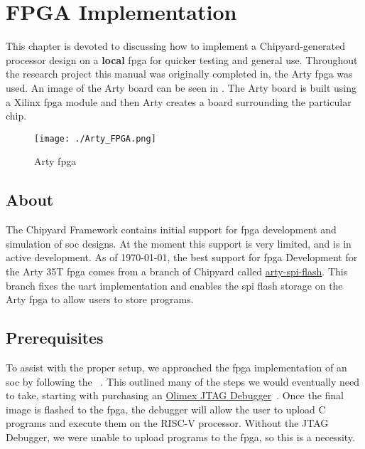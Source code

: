 \chapter{FPGA Implementation}\label{chap:FPGA_Implementation}
This chapter is devoted to discussing how to implement a Chipyard-generated processor design on a \textbf{local} \gls{fpga} for quicker testing and general use.
Throughout the research project this manual was originally completed in, the Arty \gls{fpga} was used.
An image of the Arty board can be seen in .
The Arty board is built using a Xilinx \gls{fpga} module and then Arty creates a board surrounding the particular chip.

\begin{figure}[h!tbp]
  \centering
  \texttt{[image: ./Arty\_FPGA.png]}
  \caption{Arty \Gls{fpga}}
  \label{fig:Arty_FPGA}
\end{figure}

\section{About}\label{sec:About}
The Chipyard Framework contains initial support for \gls{fpga} development and simulation of \gls{soc} designs.
At the moment this support is very limited, and is in active development.
As of \today, the best support for \Gls{fpga} Development for the Arty 35T \Gls{fpga} comes from a branch of Chipyard called \href{https://github.com/ucb-bar/chipyard/tree/arty-spi-flash}{arty-spi-flash}.
This branch fixes the \gls{uart} implementation and enables the \gls{spi} flash storage on the Arty \Gls{fpga} to allow users to store programs.

\section{Prerequisites}\label{sec:Prerequisites}
To assist with the proper setup, we approached the \Gls{fpga} implementation of an \Gls{soc} by following the ~\cite{FreedomDevGuide}.
This outlined many of the steps we would eventually need to take, starting with purchasing an \href{https://www.digikey.com/en/products/detail/olimex-ltd/ARM-USB-TINY-H/3471388}{Olimex JTAG Debugger}~\cite{OlimexJTAG}.
Once the final image is flashed to the \Gls{fpga}, the debugger will allow the user to upload C programs and execute them on the RISC-V processor. Without the JTAG Debugger, we were unable to upload programs to the \Gls{fpga}, so this is a necessity.

